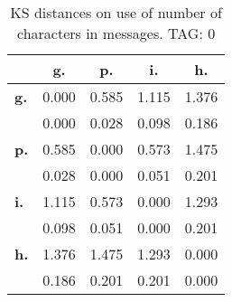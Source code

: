 \begin{table}[h!]
\begin{center}
\begin{tabular}{| l || c | c | c | c |}\hline
 & {\bf g.} & {\bf p.} & {\bf i.} & {\bf h.} \\\hline\hline
{\bf g.} & 0.000 & 0.585 & 1.115 & 1.376 \\
{\bf } & 0.000 & 0.028 & 0.098 & 0.186 \\\hline
{\bf p.} & 0.585 & 0.000 & 0.573 & 1.475 \\
{\bf } & 0.028 & 0.000 & 0.051 & 0.201 \\\hline
{\bf i.} & 1.115 & 0.573 & 0.000 & 1.293 \\
{\bf } & 0.098 & 0.051 & 0.000 & 0.201 \\\hline
{\bf h.} & 1.376 & 1.475 & 1.293 & 0.000 \\
{\bf } & 0.186 & 0.201 & 0.201 & 0.000 \\\hline
\end{tabular}
\caption{KS distances on use of number of characters in messages. TAG: 0}
\end{center}
\end{table}